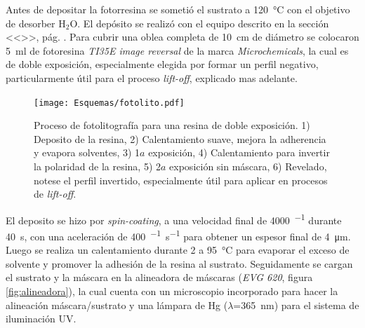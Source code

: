 		Antes de depositar la fotorresina se sometió el sustrato a \SI{120}{\celsius} con el objetivo de desorber H$_2$O. El depósito se realizó con el equipo descrito en la sección <<>>, pág. \pageref{sec:deposito_pdm}. Para cubrir una oblea completa de \SI{10}{\cm} de diámetro se colocaron \SI{5}{\ml} de fotoresina \textit{TI35E image reversal} de la marca \textit{Microchemicals}, la cual es de doble exposición, especialmente elegida por formar un perfil negativo, particularmente útil para el proceso \textit{lift-off}, explicado mas adelante.\cite{MicrochemicalsTeam2009} 
			  \begin{figure}[ht]
			  \begin{center}
			  \texttt{[image: Esquemas/fotolito.pdf]}
			  \caption[Esquema fotolitografía]{Proceso de fotolitografía para una resina de doble exposición. 1) Deposito de la resina, 2) Calentamiento suave, mejora la adherencia y evapora solventes, 3) 1$a$ exposición, 4) Calentamiento para invertir la polaridad de la resina, 5) 2$a$ exposición sin máscara, 6) Revelado, notese el perfil invertido, especialmente útil para aplicar en procesos de\textit{ lift-off}.}
			  \label{esq:fotolito}
			  \end{center}
			  \end{figure}			  
		El deposito se hizo por \textit{spin-coating}, a una velocidad final de \SI{4000}{\min^{-1}} durante \SI{40}{\second}, con una aceleración de \SI{400}{\min^{-1}.\second^{-1}} para obtener un espesor final de \SI{4}{\um}. Luego se realiza un calentamiento durante \SI{2}{\min} a \SI{95}{\celsius} para evaporar el exceso de solvente y promover la adhesión de la resina al sustrato. Seguidamente se cargan el sustrato y la máscara en la alineadora de máscaras (\textit{EVG 620}, figura \ref{fig:alineadora}), la cual cuenta con un microscopio incorporado para hacer la alineación máscara/sustrato y una lámpara de Hg ($\lambda$=\SI{365}{\nm}) para el sistema de iluminación UV. 

